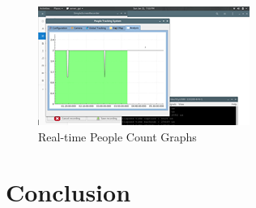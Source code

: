 \documentclass[12pt,a4paper]{report}
\begin{document}
\begin{figure}[H]
  \centering
  \includegraphics[width=\textwidth]{qt_count.png}
  \caption{Real-time People Count Graphs}
  \label{qt_graph1}
\end{figure}
\chapter{Conclusion}
\end{document}
